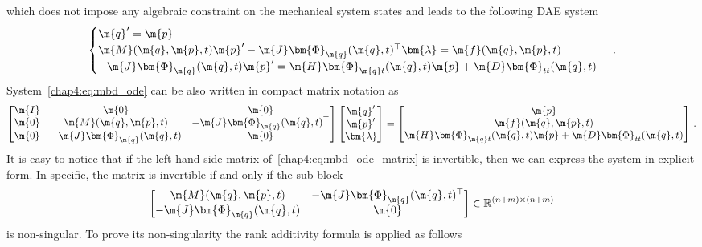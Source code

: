 %
which does not impose any algebraic constraint on the mechanical system states and leads to the following \ac{DAE} system
%
\begin{equation}
  \begin{cases}
    \m{q}^{\prime} = \m{p} \\
    \m{M}(\m{q}, \m{p}, t)\m{p}^{\prime} - \m{J}\bm{\Phi}_{\m{q}}(\m{q}, t)^{\top}\bm{\lambda} = \m{f}(\m{q},\m{p},t) \\
    -\m{J}\bm{\Phi}_{\m{q}}(\m{q}, t)\m{p}^{\prime} = \m{H}\bm{\Phi}_{\m{q}t}(\m{q}, t)\m{p} + \m{D}\bm{\Phi}_{tt}(\m{q}, t)
  \end{cases} \, \text{.}
  \label{chap4:eq:mbd_ode}
\end{equation}
%
System~\eqref{chap4:eq:mbd_ode} can be also written in compact matrix notation as
%
\begin{equation}
  \label{chap4:eq:mbd_ode_matrix}
  \begin{bmatrix}
    \m{I} & \m{0} & \m{0} \\
    \m{0}      & \m{M}(\m{q}, \m{p}, t) & -\m{J}\bm{\Phi}_{\m{q}}(\m{q}, t)^{\top} \\
    \m{0}      & -\m{J}\bm{\Phi}_{\m{q}}(\m{q}, t) & \m{0}
  \end{bmatrix}
  \begin{bmatrix}
    \m{q}^{\prime} \\
    \m{p}^{\prime} \\
    \bm{\lambda}
  \end{bmatrix}
  =
  \begin{bmatrix}
    \m{p} \\
    \m{f}(\m{q},\m{p},t) \\
    \m{H}\bm{\Phi}_{\m{q}t}(\m{q}, t)\m{p} + \m{D}\bm{\Phi}_{tt}(\m{q}, t)
  \end{bmatrix} \, \text{.}
\end{equation}
%
It is easy to notice that if the left-hand side matrix of~\eqref{chap4:eq:mbd_ode_matrix} is invertible, then we can express the system in explicit form. In specific, the matrix is invertible if and only if the sub-block
%
\begin{equation*}
  \begin{bmatrix}
    \m{M}(\m{q}, \m{p}, t) & -\m{J}\bm{\Phi}_{\m{q}}(\m{q}, t)^{\top} \\
    -\m{J}\bm{\Phi}_{\m{q}}(\m{q}, t) & \m{0}
  \end{bmatrix}
  \in\mathbb{R}^{(n+m)\times(n+m)}
\end{equation*}
%
is non-singular. To prove its non-singularity the rank additivity formula is applied as follows
